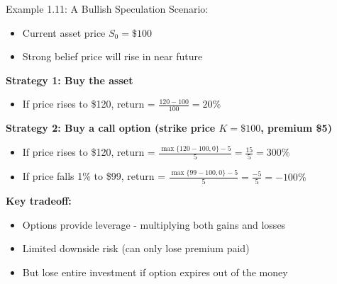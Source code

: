 \documentclass[10pt,handout]{beamer}
\begin{document}
\begin{frame}{Example 1.11: A Bullish Speculation}
  Scenario:
  \begin{itemize}
    \item Current asset price $S_0 = \$100$
    \item Strong belief price will rise in near future
  \end{itemize}
  
  \pause
  \textbf{Strategy 1: Buy the asset}
  \begin{itemize}
    \item If price rises to \$120, return = $\tfrac{120 - 100}{100} = 20\%$
  \end{itemize}
  
  \pause
  \textbf{Strategy 2: Buy a call option (strike price $K = \$100$, premium \$5)}
  \begin{itemize}
    \item If price rises to \$120, return = $\tfrac{\max\{120 - 100, 0\} - 5}{5} = \tfrac{15}{5} = 300\%$
    \item If price falls 1\% to \$99, return = $\tfrac{\max\{99 - 100, 0\} - 5}{5} = \tfrac{-5}{5} = -100\%$
  \end{itemize}
  
  \pause
  \textbf{Key tradeoff:}
  \begin{itemize}
    \item Options provide leverage - multiplying both gains and losses
    \item Limited downside risk (can only lose premium paid)
    \item But lose entire investment if option expires out of the money
  \end{itemize}
\end{frame}
\end{document}
